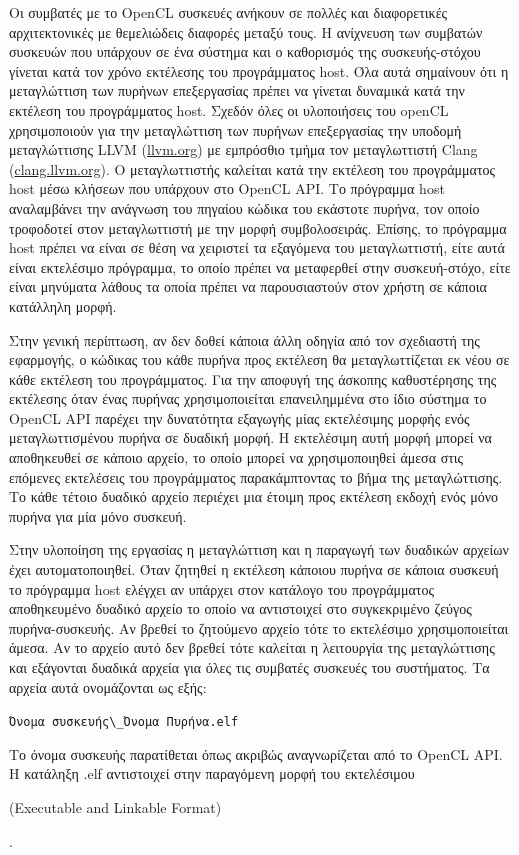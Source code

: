 Οι συμβατές με το OpenCL συσκευές ανήκουν σε πολλές και διαφορετικές αρχιτεκτονικές με θεμελιώδεις διαφορές μεταξύ τους. Η ανίχνευση των συμβατών συσκευών που υπάρχουν σε ένα σύστημα και ο καθορισμός της συσκευής-στόχου γίνεται κατά τον χρόνο εκτέλεσης του προγράμματος host. Όλα αυτά σημαίνουν ότι η μεταγλώττιση των πυρήνων επεξεργασίας πρέπει να γίνεται δυναμικά κατά  την εκτέλεση του προγράμματος host. 
Σχεδόν όλες οι υλοποιήσεις του openCL χρησιμοποιούν για την μεταγλώττιση των πυρήνων επεξεργασίας την υποδομή μεταγλώττισης LLVM (\url{llvm.org}) με εμπρόσθιο τμήμα τον μεταγλωττιστή Clang (\url{clang.llvm.org}). Ο μεταγλωττιστής καλείται κατά την εκτέλεση του προγράμματος host  μέσω κλήσεων που υπάρχουν στο OpenCL API. Το πρόγραμμα host αναλαμβάνει την ανάγνωση του πηγαίου κώδικα του εκάστοτε πυρήνα, τον οποίο τροφοδοτεί στον μεταγλωττιστή με την μορφή συμβολοσειράς. Επίσης, το πρόγραμμα host πρέπει να είναι σε θέση να χειριστεί τα εξαγόμενα του μεταγλωττιστή, είτε αυτά είναι εκτελέσιμο πρόγραμμα, το οποίο πρέπει να μεταφερθεί στην συσκευή-στόχο, είτε είναι μηνύματα λάθους τα οποία πρέπει να παρουσιαστούν στον χρήστη σε κάποια κατάλληλη μορφή.

Στην γενική περίπτωση, αν δεν δοθεί κάποια άλλη οδηγία από τον σχεδιαστή της εφαρμογής, ο κώδικας του κάθε πυρήνα προς εκτέλεση θα μεταγλωττίζεται εκ νέου σε κάθε εκτέλεση του προγράμματος. Για την αποφυγή της άσκοπης καθυστέρησης της εκτέλεσης όταν ένας πυρήνας χρησιμοποιείται επανειλημμένα στο ίδιο σύστημα το OpenCL API παρέχει την δυνατότητα εξαγωγής μίας εκτελέσιμης μορφής ενός μεταγλωττισμένου πυρήνα σε δυαδική μορφή. Η εκτελέσιμη αυτή μορφή μπορεί να αποθηκευθεί σε κάποιο αρχείο, το οποίο μπορεί να χρησιμοποιηθεί άμεσα στις επόμενες εκτελέσεις του προγράμματος παρακάμπτοντας το βήμα της μεταγλώττισης. Το κάθε τέτοιο δυαδικό αρχείο περιέχει μια έτοιμη προς εκτέλεση εκδοχή ενός μόνο πυρήνα για μία μόνο συσκευή.

Στην υλοποίηση της εργασίας η μεταγλώττιση και η παραγωγή των δυαδικών αρχείων έχει αυτοματοποιηθεί. Όταν ζητηθεί η εκτέλεση κάποιου πυρήνα σε κάποια συσκευή το πρόγραμμα host ελέγχει αν υπάρχει στον κατάλογο του προγράμματος αποθηκευμένο δυαδικό αρχείο το οποίο να αντιστοιχεί στο συγκεκριμένο ζεύγος πυρήνα-συσκευής. Αν βρεθεί το ζητούμενο αρχείο τότε το εκτελέσιμο χρησιμοποιείται άμεσα. Αν το αρχείο αυτό δεν βρεθεί τότε καλείται η λειτουργία της μεταγλώττισης και εξάγονται δυαδικά αρχεία για όλες τις συμβατές συσκευές του συστήματος. Τα αρχεία αυτά ονομάζονται ως εξής:
\begin{center}
\verb!Όνομα συσκευής\_Όνομα Πυρήνα.elf!
\end{center}
Το όνομα συσκευής παρατίθεται όπως ακριβώς αναγνωρίζεται από το OpenCL API. H κατάληξη .elf αντιστοιχεί στην παραγόμενη μορφή του εκτελέσιμου \begin{english}(Executable and Linkable Format)\end{english}. 

